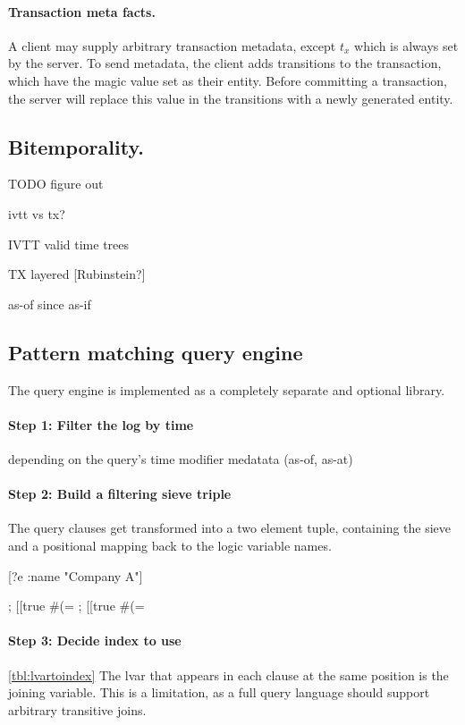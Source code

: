 \begin{itemize}
\paragraph{Transaction meta facts.}
A client may supply arbitrary transaction metadata, except $t_x$ which is always set by the server. To send metadata, the client adds transitions to the transaction, which have the magic value  set as their entity. Before committing a transaction, the server will replace this value in the transitions with a newly generated entity.




\subsection{Bitemporality.}

TODO figure out

ivtt vs tx?

IVTT valid time trees \cite{nascimento1995ivtt}

TX layered [Rubinstein?]

as-of
since
as-if


\subsection{Pattern matching query engine}

The query engine is implemented as a completely separate and optional library.

\paragraph{Step 1: Filter the log by time}
depending on the query's time modifier medatata
(as-of, as-at)

\paragraph{Step 2: Build a filtering sieve triple}

The query clauses get transformed into a two element tuple, containing the sieve and a positional mapping back to the logic variable names.

[?e :name "Company A"]

; [[true #(= %
; [[true #(= %


\paragraph{Step 3: Decide index to use}
\autoref{tbl:lvartoindex}
The lvar that appears in each clause at the same position is the joining variable. This is a limitation, as a full query language should support arbitrary transitive joins.


\end{itemize}
